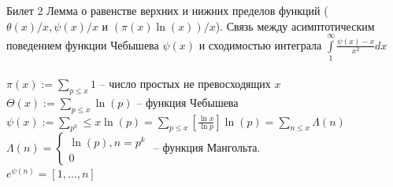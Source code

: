 \documentclass[a4paper,12pt]{article}
\newcommand{\TE}{\theta}
\newcommand{\SI}{\psi}
\newcommand{\q}{\quad}
\newcommand{\SL}{\sum\limits}
\newcommand{\IL}{\int\limits}
\newcommand{\os}{\left(}
\newcommand{\cs}{\right)}
\begin{document}
\newpage
\begin{mybox}{\hypertarget{bil2}{Билет 2}}
Лемма о равенстве верхних и нижних пределов функций ($\TE(x)/x, \SI(x)/x$ и $\os\pi(x)\ln(x)\cs/x$). Связь между асимптотическим поведением функции Чебышева $\SI(x)$ и сходимостью интеграла $\IL_1^\infty \frac{\SI(x)-x}{x^2}dx$\\
\q\\
$\pi(x):=\SL_{p\le x}1$ -- число простых не превосходящих $x$\\
$\Theta(x):=\SL_{p\le x}\ln(p)$ -- функция Чебышева\\
$\SI(x):=\SL_{p^k}\le x \ln(p) = \SL_{p\le x}\left[\frac{\ln x}{\ln p}\right]\ln(p) = \SL_{n \le x} \Lambda(n)$\\
$\Lambda(n) =\begin{cases}  \ln(p), n = p^k\\0 \end{cases}$ -- функция Мангольта.\\
$e^{\SI(n)} = [1,\dots,n]$\\


\end{mybox}
\end{document}
